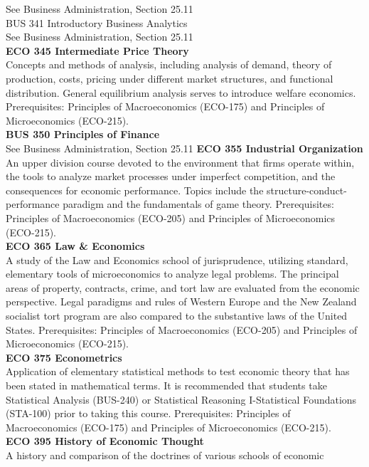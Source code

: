 \documentclass[
  letterpaper,
]{scrbook}
\begin{document}
See Business Administration, Section 25.11\\
BUS 341 Introductory Business Analytics\\
See Business Administration, Section 25.11\\
\textbf{ECO 345 Intermediate Price Theory}\\
Concepts and methods of analysis, including analysis of demand, theory
of production, costs, pricing under different market structures, and
functional distribution. General equilibrium analysis serves to
introduce welfare economics. Prerequisites: Principles of Macroeconomics
(ECO-175) and Principles of Microeconomics (ECO-215).\\
\textbf{BUS 350 Principles of Finance}\\
See Business Administration, Section 25.11 \textbf{ECO 355 Industrial
Organization}\\
An upper division course devoted to the environment that firms operate
within, the tools to analyze market processes under imperfect
competition, and the consequences for economic performance. Topics
include the structure-conduct-performance paradigm and the fundamentals
of game theory. Prerequisites: Principles of Macroeconomics (ECO-205)
and Principles of Microeconomics (ECO-215).\\
\textbf{ECO 365 Law \& Economics}\\
A study of the Law and Economics school of jurisprudence, utilizing
standard, elementary tools of microeconomics to analyze legal problems.
The principal areas of property, contracts, crime, and tort law are
evaluated from the economic perspective. Legal paradigms and rules of
Western Europe and the New Zealand socialist tort program are also
compared to the substantive laws of the United States. Prerequisites:
Principles of Macroeconomics (ECO-205) and Principles of Microeconomics
(ECO-215).\\
\textbf{ECO 375 Econometrics}\\
Application of elementary statistical methods to test economic theory
that has been stated in mathematical terms. It is recommended that
students take Statistical Analysis (BUS-240) or Statistical Reasoning
I-Statistical Foundations (STA-100) prior to taking this course.
Prerequisites: Principles of Macroeconomics (ECO-175) and Principles of
Microeconomics (ECO-215).\\
\textbf{ECO 395 History of Economic Thought}\\
A history and comparison of the doctrines of various schools of economic
\end{document}
